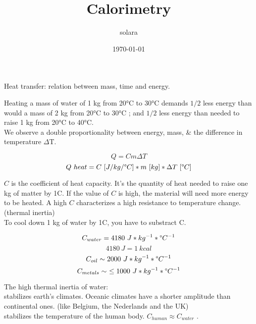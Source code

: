 \documentclass[11pt]{article}
\title{Calorimetry}
\author{solara}
\date{\today}
\begin{document}
\maketitle

Heat transfer: relation between mass, time and energy.

\vspace{1cm}
Heating a mass of water of 1 kg from 20°C to 30°C demands $1/2$ less energy than would 
a mass of 2 kg from 20°C to 30°C ; and $1/2$ less energy than needed to raise 1 kg from 20°C to 40°C. \\
We observe a double proportionality between energy, mass, \& the difference in temperature $\Delta$T.

$$Q=Cm\Delta T$$
$$Q\ heat = C\ [J/kg/\degree C] * m\ [kg] * \Delta T\ [\degree C]$$
\vspace{0cm}

$C$ is the coefficient of heat capacity. It's the quantity of heat needed to raise one kg of matter by 1\degree C.
If the value of $C$ is high, the material will need more energy to be heated. A high $C$ characterizes a high
resistance to temperature change. (thermal inertia) \\
To cool down 1 kg of water by 1\degree C, you have to substract C.

$$C_{water} = 4180\ J*kg^{-1}*\degree C^{-1}$$
$$4180\ J = 1\ kcal$$
$$C_{oil} \sim 2000\ J*kg^{-1}*\degree C^{-1}$$
$$C_{metals} \sim\ \leq 1000\ J*kg^{-1}*\degree C^{-1}$$
\vspace{0cm}

The high thermal inertia of water: \\
\ce{->} stabilizes earth's climates. Oceanic climates have a shorter amplitude than continental ones.
(like Belgium, the Nederlands and the UK) \\
\ce{->} stabilizes the temperature of the human body. $C_{human} \approx C_{water}$ .
\end{document}
